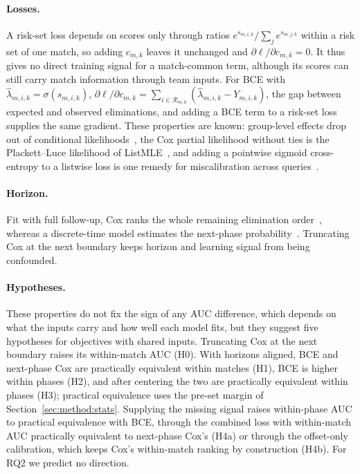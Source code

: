 \documentclass[sigconf,anonymous]{acmart}
\begin{document}
\paragraph{Losses.}
A risk-set loss depends on scores only through ratios $e^{s_{m,i,k}}/\sum_{j}e^{s_{m,j,k}}$ within a risk set of one match, so adding $c_{m,k}$ leaves it unchanged and $\partial\ell/\partial c_{m,k}=0$. It thus gives no direct training signal for a match-common term, although its scores can still carry match information through team inputs. For BCE with $\hat\lambda_{m,i,k}=\sigma(s_{m,i,k})$, $\partial\ell/\partial c_{m,k}=\sum_{i\in\mathcal{R}_{m,k}}(\hat\lambda_{m,i,k}-Y_{m,i,k})$, the gap between expected and observed eliminations, and adding a BCE term to a risk-set loss supplies the same gradient. These properties are known: group-level effects drop out of conditional likelihoods~\cite{Chamberlain80}, the Cox partial likelihood without ties is the Plackett--Luce likelihood of ListMLE~\cite{Xia08}, and adding a pointwise sigmoid cross-entropy to a listwise loss is one remedy for miscalibration across queries~\cite{Bai23}.

\paragraph{Horizon.}
Fit with full follow-up, Cox ranks the whole remaining elimination order~\cite{Cox72}, whereas a discrete-time model estimates the next-phase probability~\cite{SingerWillett93,Gensheimer19}. Truncating Cox at the next boundary keeps horizon and learning signal from being confounded.

\paragraph{Hypotheses.}
These properties do not fix the sign of any AUC difference, which depends on what the inputs carry and how well each model fits, but they suggest five hypotheses for objectives with shared inputs. Truncating Cox at the next boundary raises its within-match AUC (H0). With horizons aligned, BCE and next-phase Cox are practically equivalent within matches (H1), BCE is higher within phases (H2), and after centering the two are practically equivalent within phases (H3); practical equivalence uses the pre-set margin of Section~\ref{sec:method:stats}. Supplying the missing signal raises within-phase AUC to practical equivalence with BCE, through the combined loss with within-match AUC practically equivalent to next-phase Cox's (H4a) or through the offset-only calibration, which keeps Cox's within-match ranking by construction (H4b). For RQ2 we predict no direction.
\end{document}
